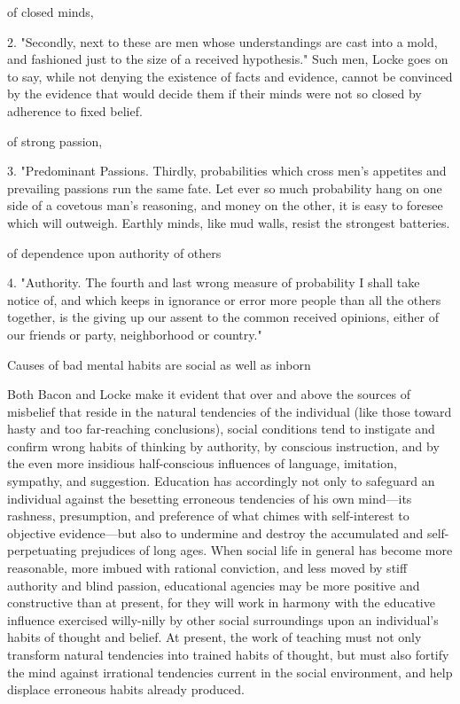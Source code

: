 \documentclass[letterpaper]{book}
\begin{document}
of closed minds,

2. "Secondly, next to these are men whose understandings are cast into a
mold, and fashioned just to the size of a received hypothesis." Such
men, Locke goes on to say, while not denying the existence of facts and
evidence, cannot be convinced by the evidence
that
would decide them if their minds were not so closed by adherence to
fixed belief.

of strong passion,

3. "Predominant Passions. Thirdly, probabilities which cross men's
appetites and prevailing passions run the same fate. Let ever so much
probability hang on one side of a covetous man's reasoning, and money on
the other, it is easy to foresee which will outweigh. Earthly minds,
like mud walls, resist the strongest batteries.

of dependence upon authority of others

4. "Authority. The fourth and last wrong measure of probability I shall
take notice of, and which keeps in ignorance or error more people than
all the others together, is the giving up our assent to the common
received opinions, either of our friends or party, neighborhood or
country."

Causes of bad mental habits are social as well as inborn

Both Bacon and Locke make it evident that over and above the sources of
misbelief that reside in the natural tendencies of the individual (like
those toward hasty and too far-reaching conclusions), social conditions
tend to instigate and confirm wrong habits of thinking by authority, by
conscious instruction, and by the even more insidious half-conscious
influences of language, imitation, sympathy, and suggestion. Education
has accordingly not only to safeguard an individual against the
besetting erroneous tendencies of his own mind---its rashness,
presumption, and preference of what chimes with self-interest to
objective evidence---but also to undermine and destroy the accumulated
and self-perpetuating prejudices of long ages. When social life in
general has become more reasonable, more imbued with rational
conviction, and less moved by stiff authority and blind passion,
educational agencies may be more positive and constructive than at
present, for they
will
work in harmony with the educative influence exercised willy-nilly by
other social surroundings upon an individual's habits of thought and
belief. At present, the work of teaching must not only transform natural
tendencies into trained habits of thought, but must also fortify the
mind against irrational tendencies current in the social environment,
and help displace erroneous habits already produced.
\end{document}
